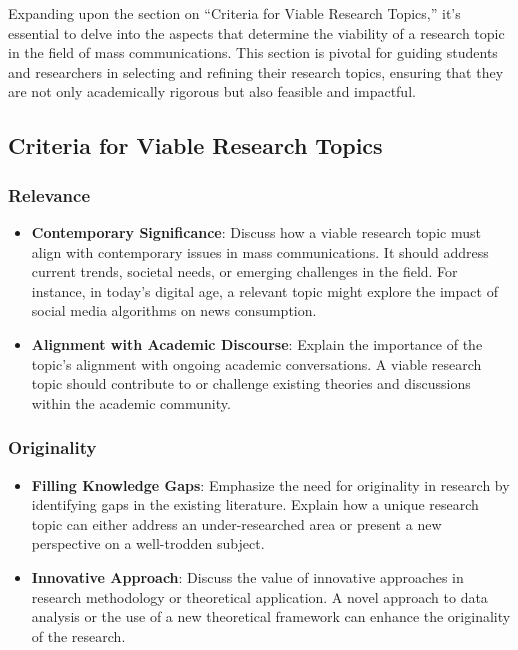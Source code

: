 \documentclass[
]{book}
\providecommand{\tightlist}{%
  \setlength{\itemsep}{0pt}\setlength{\parskip}{0pt}}
\begin{document}
Expanding upon the section on ``Criteria for Viable Research Topics,'' it's essential to delve into the aspects that determine the viability of a research topic in the field of mass communications. This section is pivotal for guiding students and researchers in selecting and refining their research topics, ensuring that they are not only academically rigorous but also feasible and impactful.

\hypertarget{criteria-for-viable-research-topics-1}{%
\subsection*{Criteria for Viable Research Topics}\label{criteria-for-viable-research-topics-1}}

\hypertarget{relevance}{%
\subsubsection*{Relevance}\label{relevance}}

\begin{itemize}
\tightlist
\item
  \textbf{Contemporary Significance}: Discuss how a viable research topic must align with contemporary issues in mass communications. It should address current trends, societal needs, or emerging challenges in the field. For instance, in today's digital age, a relevant topic might explore the impact of social media algorithms on news consumption.
\item
  \textbf{Alignment with Academic Discourse}: Explain the importance of the topic's alignment with ongoing academic conversations. A viable research topic should contribute to or challenge existing theories and discussions within the academic community.
\end{itemize}

\hypertarget{originality}{%
\subsubsection*{Originality}\label{originality}}

\begin{itemize}
\tightlist
\item
  \textbf{Filling Knowledge Gaps}: Emphasize the need for originality in research by identifying gaps in the existing literature. Explain how a unique research topic can either address an under-researched area or present a new perspective on a well-trodden subject.
\item
  \textbf{Innovative Approach}: Discuss the value of innovative approaches in research methodology or theoretical application. A novel approach to data analysis or the use of a new theoretical framework can enhance the originality of the research.
\end{itemize}
\end{document}

